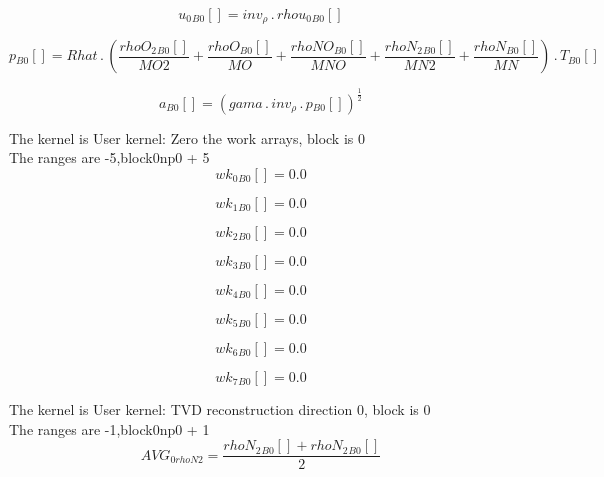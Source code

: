 \documentclass{article}
\begin{document}
\begin{dmath}{u_{0}{_{B0}}}[{}] = inv_{\rho} \,.\, {rhou_{0}{_{B0}}}[{}]\end{dmath}

\begin{dmath}{p{_{B0}}}[{}] = Rhat \,.\, \left(\frac{{rhoO_{2}{_{B0}}}[{}]}{MO2} + \frac{{rhoO{_{B0}}}[{}]}{MO} + \frac{{rhoNO{_{B0}}}[{}]}{MNO} + \frac{{rhoN_{2}{_{B0}}}[{}]}{MN2} + \frac{{rhoN{_{B0}}}[{}]}{MN}\right) \,.\, {T{_{B0}}}[{}]\end{dmath}

\begin{dmath}{a{_{B0}}}[{}] = \left(gama \,.\, inv_{\rho} \,.\, {p{_{B0}}}[{}] \right)^{\frac{1}{2}}\end{dmath}

\noindent The kernel is User kernel: Zero the work arrays, block is 0\\\noindent The ranges are -5,block0np0 + 5\\\begin{dmath}{wk_{0}{_{B0}}}[{}] = 0.0\end{dmath}

\begin{dmath}{wk_{1}{_{B0}}}[{}] = 0.0\end{dmath}

\begin{dmath}{wk_{2}{_{B0}}}[{}] = 0.0\end{dmath}

\begin{dmath}{wk_{3}{_{B0}}}[{}] = 0.0\end{dmath}

\begin{dmath}{wk_{4}{_{B0}}}[{}] = 0.0\end{dmath}

\begin{dmath}{wk_{5}{_{B0}}}[{}] = 0.0\end{dmath}

\begin{dmath}{wk_{6}{_{B0}}}[{}] = 0.0\end{dmath}

\begin{dmath}{wk_{7}{_{B0}}}[{}] = 0.0\end{dmath}

\noindent The kernel is User kernel: TVD reconstruction direction 0, block is 0\\\noindent The ranges are -1,block0np0 + 1\\\begin{dmath}AVG_{0 rhoN2} = \frac{{rhoN_{2}{_{B0}}}[{}] + {rhoN_{2}{_{B0}}}[{}]}{2}\end{dmath}
\end{document}
